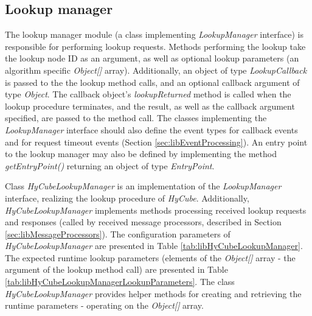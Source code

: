 \subsection{Lookup manager}
\label{sec:libLookupManager}

The lookup manager module (a class implementing \emph{LookupManager} interface) is responsible for performing lookup requests. Methods performing the lookup take the lookup node ID as an argument, as well as optional lookup parameters (an algorithm specific \emph{Object[]} array). Additionally, an object of type \emph{LookupCallback} is passed to the the lookup method calls, and an optional callback argument of type \emph{Object}. The callback object's \emph{lookupReturned} method is called when the lookup procedure terminates, and the result, as well as the callback argument specified, are passed to the method call. The classes implementing the \emph{LookupManager} interface should also define the event types for callback events and for request timeout events (Section \ref{sec:libEventProcessing}). An entry point to the lookup manager may also be defined by implementing the method \emph{getEntryPoint()} returning an object of type \emph{EntryPoint}.

Class \emph{HyCubeLookupManager} is an implementation of the \emph{LookupManager} interface, realizing the lookup procedure of \emph{HyCube}. Additionally, \emph{HyCubeLookupManager} implements methods processing received lookup requests and responses (called by received message processors, described in Section \ref{sec:libMessageProcessors}). The configuration parameters of \emph{HyCubeLookupManager} are presented in Table \ref{tab:libHyCubeLookupManager}. The expected runtime lookup parameters (elements of the \emph{Object[]} array - the argument of the lookup method call) are presented in Table \ref{tab:libHyCubeLookupManagerLookupParameters}. The class \emph{HyCubeLookupManager} provides helper methods for creating and retrieving the runtime parameters - operating on the \emph{Object[]} array.


